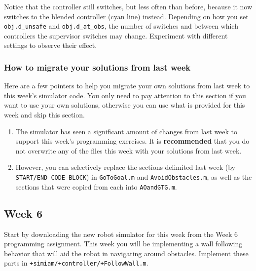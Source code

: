 \documentclass[10pt]{article}
\begin{document}
\begin{enumerate}
  Notice that the controller still switches, but less often than before, because it now switches to the blended controller (cyan line) instead. Depending on how you set \texttt{obj.d\_unsafe} and \texttt{obj.d\_at\_obs}, the number of switches and between which controllers the supervisor switches may change. Experiment with different settings to observe their effect.
    
\end{enumerate}

\subsubsection*{How to migrate your solutions from last week}
Here are a few pointers to help you migrate your own solutions from last week to this week's simulator code. You only need to pay attention to this section if you want to use your own solutions, otherwise you can use what is provided for this week and skip this section.

\begin{enumerate}
 \item The simulator has seen a significant amount of changes from last week to support this week's programming exercises. It is \textbf{recommended} that you do not overwrite any of the files this week with your solutions from last week.
 \item However, you can selectively replace the sections delimited last week (by \texttt{START/END CODE BLOCK}) in \texttt{GoToGoal.m} and \texttt{AvoidObstacles.m}, as well as the sections that were copied from each into \texttt{AOandGTG.m}.
\end{enumerate}

\newpage
\subsection{Week 6}

Start by downloading the new robot simulator for this week from the Week 6 programming assignment. This week you will be implementing a wall following behavior that will aid the robot in navigating around obstacles. Implement these parts in \texttt{+simiam/+controller/+FollowWall.m}.
\end{document}
